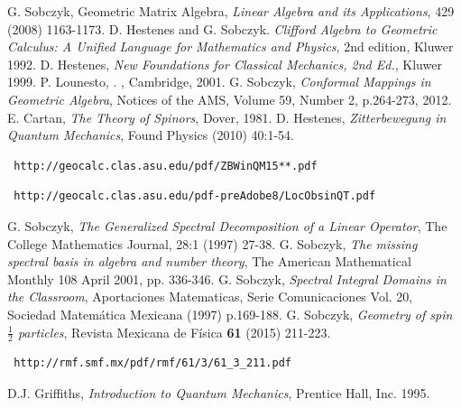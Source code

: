 \documentclass[]{article}
\begin{document}
\begin{thebibliography}{}
 G. Sobczyk, Geometric Matrix Algebra, 
{\em Linear Algebra and its Applications}, 429 (2008) 1163-1173.
 D. Hestenes and G. Sobczyk. {\it Clifford Algebra to
Geometric Calculus: A Unified Language for Mathematics and Physics},
2nd edition, Kluwer 1992.
 D. Hestenes, {\em New Foundations for Classical Mechanics, 2nd Ed.}, Kluwer 1999.
 P. Lounesto, 
.
, Cambridge, 2001.
 G. Sobczyk, {\it Conformal Mappings in Geometric Algebra}, Notices of the AMS, 
Volume 59, Number 2, p.264-273, 2012.
 E. Cartan, {\em The Theory of Spinors}, Dover, 1981. 
 D. Hestenes, {\em Zitterbewegung in Quantum Mechanics}, Found Physics (2010) 40:1-54.
\begin{verbatim} http://geocalc.clas.asu.edu/pdf/ZBWinQM15**.pdf \end{verbatim}
\begin{verbatim} http://geocalc.clas.asu.edu/pdf-preAdobe8/LocObsinQT.pdf \end{verbatim}
 G. Sobczyk, {\it The Generalized Spectral Decomposition
of a Linear Operator}, The College Mathematics
Journal, 28:1 (1997) 27-38.
 G. Sobczyk, {\it The missing spectral basis in algebra and number theory}, The American
Mathematical Monthly 108 April 2001, pp. 336-346.
 G. Sobczyk, {\it Spectral Integral Domains in the Classroom},
Aportaciones Matematicas, Serie Comunicaciones Vol. 20, Sociedad Matem\'atica Mexicana
(1997) p.169-188.
 G. Sobczyk, {\it Geometry of spin $\frac{1}{2}$ particles}, Revista Mexicana de
F\'isica {\bf 61} (2015) 211-223.
\begin{verbatim} http://rmf.smf.mx/pdf/rmf/61/3/61_3_211.pdf \end{verbatim}
 D.J. Griffiths, {\em Introduction to Quantum Mechanics}, Prentice Hall, Inc. 1995.




\end{thebibliography}
\end{document}
